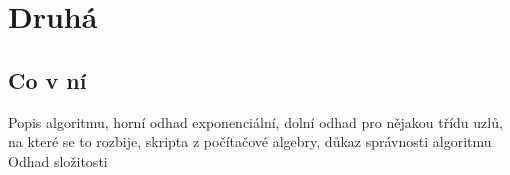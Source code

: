 \chapter{Druhá}


\section{Co v ní}

Popis algoritmu, horní odhad exponenciální, dolní odhad pro nějakou třídu uzlů, na které se to rozbije, skripta z počítačové algebry, důkaz správnosti algoritmu
Odhad složitosti
